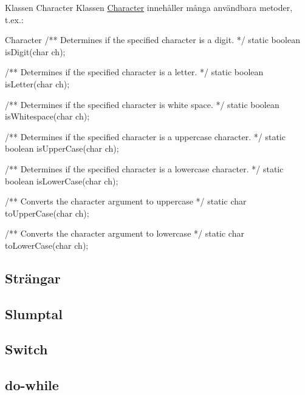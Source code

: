 \documentclass{lecturenotes}
\begin{document}
\begin{Slide}{Klassen Character}
Klassen \href{https://docs.oracle.com/javase/8/docs/api/java/lang/Character.html}{Character} innehåller många användbara metoder, t.ex.:
\begin{ClassSpec}{Character}
/** Determines if the specified character is a digit. */
static boolean isDigit(char ch);

/** Determines if the specified character is a letter. */
static boolean isLetter(char ch);

/** Determines if the specified character is white space. */
static boolean isWhitespace(char ch);

/** Determines if the specified character is a uppercase character. */
static boolean isUpperCase(char ch);

/** Determines if the specified character is a lowercase character. */
static boolean isLowerCase(char ch);

/** Converts the character argument to uppercase */
static char toUpperCase(char ch);

/** Converts the character argument to lowercase */
static char toLowerCase(char ch);
\end{ClassSpec}
\end{Slide}

\subsection{Strängar}
\subsection{Slumptal}
\subsection{Switch}
\subsection{do-while}
\end{document}
